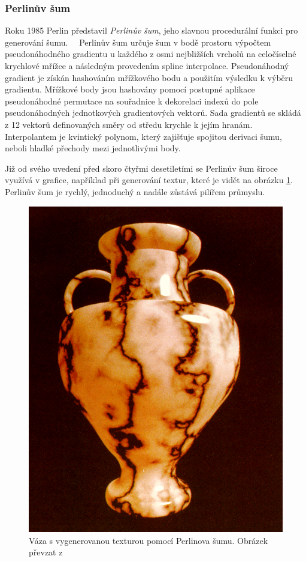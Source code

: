 \subsubsection{Perlinův šum}
\label{perlinNoise}
Roku 1985 Perlin představil \textit{Perlinův šum}, jeho slavnou procedurální funkci pro generování šumu.~\cite{PerlinKen}~\cite{Perlin2002ImprovingN} Perlinův šum určuje šum v bodě prostoru výpočtem pseudonáhodného gradientu u každého z osmi nejbližších vrcholů na celočíselné krychlové mřížce a následným provedením spline interpolace. Pseudonáhodný gradient je získán hashováním mřížkového bodu a použitím výsledku k výběru gradientu. Mřížkové body jsou hashovány pomocí postupné aplikace pseudonáhodné permutace na souřadnice k dekorelaci indexů do pole pseudonáhodných jednotkových gradientových vektorů. Sada gradientů se skládá z 12 vektorů definovaných směry od středu krychle k jejím hranám. Interpolantem je kvintický polynom, který zajišťuje spojitou derivaci šumu, neboli hladké přechody mezi jednotlivými body.

Již od svého uvedení před skoro čtyřmi desetiletími se Perlinův šum široce využívá v grafice, například při generování textur, které je vidět na obrázku \ref{PerlinVase}. Perlinův šum je rychlý, jednoduchý a nadále zůstává pilířem průmyslu.

\begin{figure}[H]
	\centering
	\includegraphics[scale=0.3]{obrazky-figures/PerlinNoiseVase.png}
	\caption{Váza s vygenerovanou texturou pomocí Perlinova šumu. Obrázek převzat z \cite{PerlinKen}}
	\label{PerlinVase}
\end{figure}

